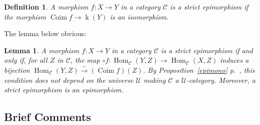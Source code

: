 \documentclass[12pt]{article}%
\newtheorem{lem}[thm]{Lemma}
\newtheorem{df}[thm]{Definition}%
\theoremstyle{remark}
\theoremstyle{definition}
\newcommand{\C}{\mathcal C}
\newcommand{\U}{\mathcal U}
\newcommand{\xr}{\xrightarrow}
\DeclareMathOperator{\Coim}{Coim}
\DeclareMathOperator{\ky}{k}
\DeclareMathOperator{\Hom}{Hom}%
\begin{document}
\begin{df}
A morphism $f:X\to Y$ in a category $\C$ is a {\em strict epimorphism}  if the morphism $\Coim f\to\ky(Y)$ is an isomorphism.
\end{df} 

The lemma below obvious:

\begin{lem}\label{strepi}
A morphism $f:X\to Y$ in a category $\C$ is a strict epimorphism if and only if, for all $Z$ in $\C$, the map $\circ f:\Hom_\C(Y,Z)\to\Hom_\C(X,Z)$ induces a bijection $\Hom_\C(Y,Z)\xr\sim(\Coim f)(Z)$. By Proposition~\ref{epimono} p.~\pageref{epimono}, this condition does not depend on the universe $\U$ making $\C$ a $\U$-category. Moreover, a strict epimorphism is an epimorphism. 
\end{lem} 


\subsection{Brief Comments}
\end{document}
